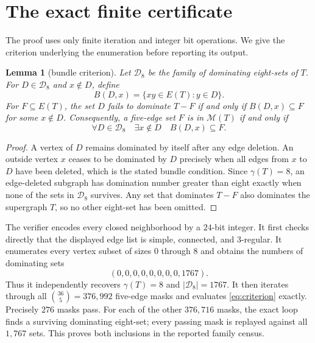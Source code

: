 \documentclass[11pt]{article}
\newtheorem{lemma}[theorem]{Lemma}
\begin{document}
\section{The exact finite certificate}

The proof uses only finite iteration and integer bit operations.  We
give the criterion underlying the enumeration before reporting its
output.

\begin{lemma}[bundle criterion]\label{lem:bundle}
Let $\mathcal D_8$ be the family of dominating eight-sets of $T$.  For
$D\in\mathcal D_8$ and $x\notin D$, define
\[
 B(D,x)=\{xy\in E(T):y\in D\}.
\]
For $F\subseteq E(T)$, the set $D$ fails to dominate $T-F$ if and only
if $B(D,x)\subseteq F$ for some $x\notin D$.  Consequently, a five-edge
set $F$ is in $\mathcal M(T)$ if and only if
\[
 \forall D\in\mathcal D_8\quad
 \exists x\notin D\quad B(D,x)\subseteq F.
 \tag{1}\label{eq:criterion}
\]
\end{lemma}

\begin{proof}
A vertex of $D$ remains dominated by itself after any edge deletion.
An outside vertex $x$ ceases to be dominated by $D$ precisely when all
edges from $x$ to $D$ have been deleted, which is the stated bundle
condition.  Since $\gamma(T)=8$, an edge-deleted subgraph has domination
number greater than eight exactly when none of the sets in
$\mathcal D_8$ survives.  Any set that dominates $T-F$ also dominates
the supergraph $T$, so no other eight-set has been omitted.
\end{proof}

The verifier encodes every closed neighborhood by a $24$-bit integer.
It first checks directly that the displayed edge list is simple,
connected, and $3$-regular.  It enumerates every vertex subset of sizes
$0$ through $8$ and obtains the numbers of dominating sets
\[
 (0,0,0,0,0,0,0,0,1767).
 \tag{2}\label{eq:domcounts}
\]
Thus it independently recovers $\gamma(T)=8$ and $|\mathcal D_8|=1767$.
It then iterates through all
\(\binom{36}{5}=376{,}992\) five-edge masks and evaluates
\eqref{eq:criterion} exactly.  Precisely $276$ masks pass.  For each of
the other $376{,}716$ masks, the exact loop finds a
surviving dominating eight-set; every passing mask is replayed against
all $1{,}767$ sets.  This proves both inclusions in the reported family
census.
\end{document}
